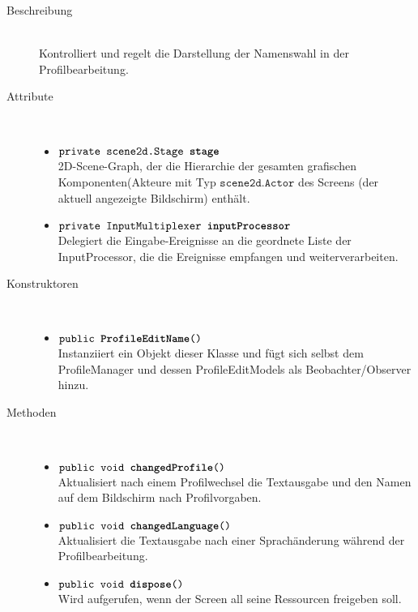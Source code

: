 \begin{description}
\item[Beschreibung] \hfill \\ Kontrolliert und regelt die Darstellung der Namenswahl in der Profilbearbeitung.
\item[Attribute] \hfill \\
	\vspace{-.8cm}
	\begin{itemize}
		\item $\texttt{private scene2d.Stage \textbf{stage}}$ \\ 2D-Scene-Graph, der die Hierarchie der gesamten grafischen Komponenten(Akteure mit Typ $\texttt{scene2d.Actor}$ des Screens (der aktuell angezeigte Bildschirm) enthält. 
		\item $\texttt{private InputMultiplexer \textbf{inputProcessor}}$ \\ Delegiert die Eingabe-Ereignisse an die geordnete Liste der InputProcessor, die die Ereignisse empfangen und weiterverarbeiten.
	\end{itemize}
	
\item[Konstruktoren] \hfill \\
	\vspace{-.8cm}
	\begin{itemize}
		\item $\texttt{public \textbf{ProfileEditName}()}$ \\ Instanziiert ein Objekt dieser Klasse und fügt sich selbst dem ProfileManager und dessen ProfileEditModels als Beobachter/Observer hinzu.
	\end{itemize}
	
\item[Methoden] \hfill \\
	\vspace{-.8cm}
	\begin{itemize}		
		\item $\texttt{public void \textbf{changedProfile}()}$ \\ Aktualisiert nach einem Profilwechsel die Textausgabe und den Namen auf dem Bildschirm nach Profilvorgaben.
		
		\item $\texttt{public void \textbf{changedLanguage}()}$ \\ Aktualisiert die Textausgabe nach einer Sprachänderung während der Profilbearbeitung.	
		
		\item $\texttt{public void \textbf{dispose}()}$ \\ Wird aufgerufen, wenn der Screen all seine Ressourcen freigeben soll.
		

\end{itemize}
\end{description}
